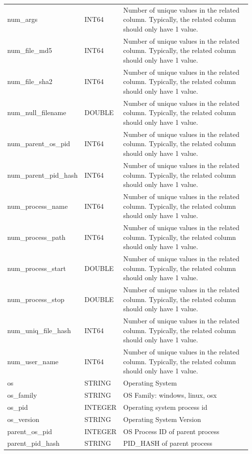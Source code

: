 \documentclass[conference,compsoc]{IEEEtran}
\begin{document}
\begin{longtable}{|p{5cm}|p{2cm}|p{9cm}|}
num\_args & INT64 & Number of unique values in the related column. Typically, the related column should only have 1 value. \\
num\_file\_md5 & INT64 & Number of unique values in the related column. Typically, the related column should only have 1 value. \\
num\_file\_sha2 & INT64 & Number of unique values in the related column. Typically, the related column should only have 1 value. \\
num\_null\_filename & DOUBLE & Number of unique values in the related column. Typically, the related column should only have 1 value. \\
num\_parent\_os\_pid & INT64 & Number of unique values in the related column. Typically, the related column should only have 1 value. \\
num\_parent\_pid\_hash & INT64 & Number of unique values in the related column. Typically, the related column should only have 1 value. \\
num\_process\_name & INT64 & Number of unique values in the related column. Typically, the related column should only have 1 value. \\
num\_process\_path & INT64 & Number of unique values in the related column. Typically, the related column should only have 1 value. \\
num\_process\_start & DOUBLE & Number of unique values in the related column. Typically, the related column should only have 1 value. \\
num\_process\_stop & DOUBLE & Number of unique values in the related column. Typically, the related column should only have 1 value. \\
num\_uniq\_file\_hash & INT64 & Number of unique values in the related column. Typically, the related column should only have 1 value. \\
num\_user\_name & INT64 & Number of unique values in the related column. Typically, the related column should only have 1 value. \\
os & STRING & Operating System \\
os\_family & STRING & OS Family: windows, linux, osx \\
os\_pid & INTEGER & Operating system process id \\
os\_version & STRING & Operating System Version \\
parent\_os\_pid & INTEGER & OS Process ID of parent process \\
parent\_pid\_hash & STRING & PID\_HASH of parent process \\

\end{longtable}
\end{document}
